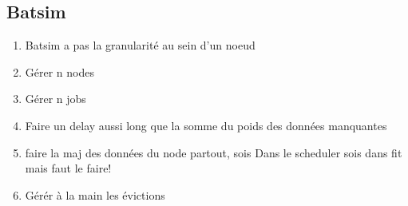 \documentclass[a4paper]{article}
\begin{document}
	\subsection{Batsim}
		\begin{enumerate}
			\item Batsim a pas la granularité au sein d'un noeud
			\item Gérer n nodes
			\item Gérer n jobs
			\item Faire un delay aussi long que la somme du poids des données manquantes
			\item faire la maj des données du node partout, sois Dans le scheduler sois dans fit mais faut le faire!
			\item Gérér à la main les évictions
		\end{enumerate}
\end{document}
